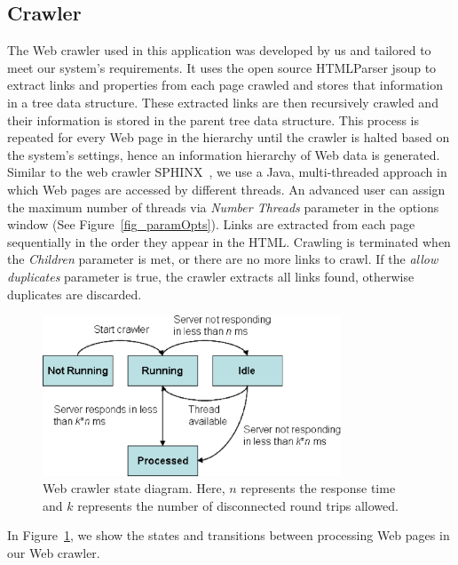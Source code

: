 \documentclass[]{article}
\begin{document}
{\subsection{Crawler}
\label{sss:crawler}

The Web crawler used in this application was developed by us and tailored to meet our system's requirements. It uses the open source HTMLParser jsoup \cite{jsoup} to extract links and properties from each page crawled and stores that information in a tree data structure. These extracted links are then recursively crawled and their information is stored in the parent tree data structure. This process is repeated for every Web page in the hierarchy until the crawler is halted based on the system's settings, hence an information hierarchy of Web data is generated.
Similar to the web crawler SPHINX~\cite{mb98}, we use a Java, multi-threaded approach in which Web pages are accessed by different threads. An advanced user can assign the maximum number of threads via {\em Number Threads} parameter in the options window (See Figure~\ref{fig_paramOpts}). 
Links are extracted from each page sequentially in the order they appear in the HTML. Crawling is terminated when the {\em Children} parameter is met, or there are no more links to crawl. If the {\em allow duplicates} parameter is true, the crawler extracts all links found, otherwise duplicates are discarded.

\begin{figure}[t]
\centering
\includegraphics[width=3.5in]{images/newState2}
\caption{Web crawler state diagram. Here, $n$ represents the response time and $k$ represents the number of disconnected round trips allowed.}
\label{fig_state}
\end{figure}

In Figure~\ref{fig_state}, we show the states and transitions between processing Web pages in our Web crawler.

}
\end{document}
